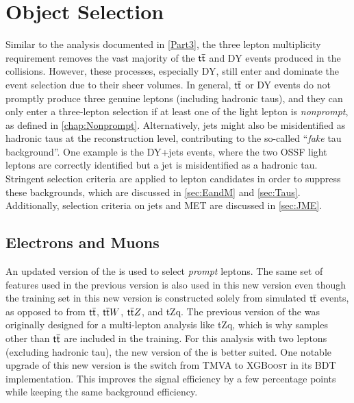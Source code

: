 \chapter{Object Selection}
\label{chap:Obj}

Similar to the analysis documented in \autoref{Part3}, the three lepton multiplicity requirement removes the vast majority of the $\textsf{t}\overline{\textsf{t}}$ and \ac{DY} events produced in the collisions. However, these processes, especially \ac{DY}, still enter and dominate the event selection due to their sheer volumes. In general, $\textsf{t}\overline{\textsf{t}}$ or \ac{DY} events do not promptly produce three genuine leptons (including hadronic taus), and they can only enter a three-lepton selection if at least one of the light lepton is \emph{nonprompt}, as defined in \autoref{chap:Nonprompt}. Alternatively, jets might also be misidentified as hadronic taus at the reconstruction level, contributing to the so-called ``\emph{fake} tau background''. One example is the \ac{DY}+jets events, where the two \ac{OSSF} light leptons are correctly identified but a jet is misidentified as a hadronic tau. Stringent selection criteria are applied to lepton candidates in order to suppress these backgrounds, which are discussed in \autoref{sec:EandM} and \autoref{sec:Taus}. Additionally, selection criteria on jets and \ac{MET} are discussed in \autoref{sec:JME}.

\section{Electrons and Muons}
\label{sec:EandM}

An updated version of the \TOP\cite{CMS:2023ftu} is used to select \emph{prompt} leptons. The same set of features used in the previous version is also used in this new version even though the training set in this new version is constructed solely from simulated $\textsf{t}\overline{\textsf{t}}$ events, as opposed to from $\textsf{t}\overline{\textsf{t}}$, $\textsf{t}\overline{\textsf{t}} W$, $\textsf{t}\overline{\textsf{t}} Z$, and tZq. The previous version of the \TOP was originally designed for a multi-lepton analysis like tZq, which is why samples other than $\textsf{t}\overline{\textsf{t}}$ are included in the training. For this analysis with two leptons (excluding hadronic tau), the new version of the \TOP is better suited. One notable upgrade of this new version is the switch from TMVA \cite{TMVA:2007ngy} to \textsc{XGBoost} \cite{Chen:2016:XST:2939672.2939785} in its \ac{BDT} implementation. This improves the signal efficiency by a few percentage points while keeping the same background efficiency. 

